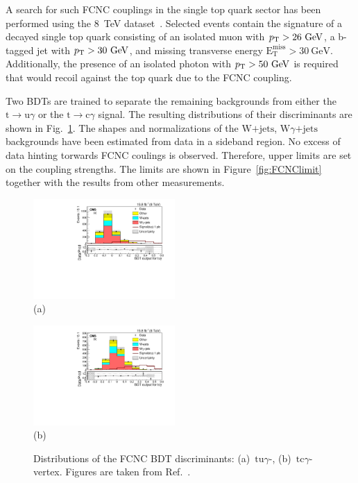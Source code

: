 \documentclass{PoS}
\begin{document}
A search for such FCNC couplings in the single top quark sector has been performed using the 8~TeV dataset~\cite{CMS-PAS-TOP-14-003}. Selected events contain the signature of a decayed single top quark consisting of an isolated muon with $p_\mathrm{T}>26~\mathrm{GeV}$, a b-tagged jet with $p_\mathrm{T}>30~\mathrm{GeV}$, and missing transverse energy $\mathrm{E}^\mathrm{miss}_\mathrm{T}>30~\mathrm{GeV}$. Additionally, the presence of an isolated photon with $p_\mathrm{T}>50~\mathrm{GeV}$ is required that would recoil against the top quark due to the FCNC coupling.


Two BDTs are trained to separate the remaining backgrounds from either the $\mathrm{t}\to\mathrm{u}\gamma$ or the $\mathrm{t}\to\mathrm{c}\gamma$ signal. The resulting distributions of their discriminants are shown in Fig.~\ref{fig:FCNC}. The shapes and normalizations of the $\mathrm{W}\mbox{+}\mathrm{jets}$, $\mathrm{W}\gamma\mbox{+}\mathrm{jets}$ backgrounds have been estimated from data in a sideband region. No excess of data hinting torwards FCNC coulings is observed. Therefore, upper limits are set on the coupling strengths. The limits are shown in Figure~\ref{fig:FCNClimit} together with the results from other measurements.


\begin{figure}[htbp]
\begin{center}
\parbox[t]{0.49\textwidth}{\centering\includegraphics[width=0.48\textwidth]{figures/FCNC/BDT_utg.pdf}\\(a)}
\parbox[t]{0.49\textwidth}{\centering\includegraphics[width=0.48\textwidth]{figures/FCNC/BDT_ctg.pdf}\\(b)}
\caption{\label{fig:FCNC}Distributions of the FCNC BDT discriminants: (a)~$\mathrm{tu}\gamma$-, (b)~$\mathrm{tc}\gamma$-vertex. Figures are taken from Ref.~\cite{CMS-PAS-TOP-14-003}.}
\end{center}
\end{figure}
\end{document}
